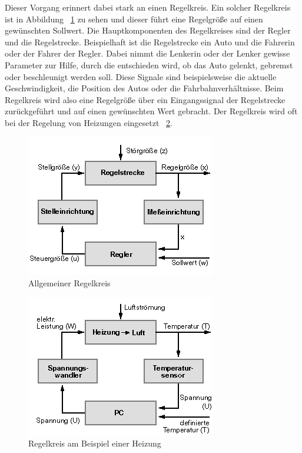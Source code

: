 Dieser Vorgang erinnert dabei stark an einen Regelkreis.
Ein solcher Regelkreis ist in Abbildung ~\ref{fig:regelkreis} zu sehen und dieser führt eine Regelgröße auf einen gewünschten Sollwert.
Die Hauptkomponenten des Regelkreises sind der Regler und die Regelstrecke.
Beispielhaft ist die Regelstrecke ein Auto und die Fahrerin oder der Fahrer der Regler.
Dabei nimmt die Lenkerin oder der Lenker gewisse Parameter zur Hilfe, durch die entschieden wird, ob das Auto gelenkt, gebremst oder beschleunigt werden soll.
Diese Signale sind beispielsweise die aktuelle Geschwindigkeit, die Position des Autos oder die Fahrbahnverhältnisse.
Beim Regelkreis wird also eine Regelgröße über ein Eingangssignal der Regelstrecke zurückgeführt und auf einen gewünschten Wert gebracht.
Der Regelkreis wird oft bei der Regelung von Heizungen eingesetzt ~\ref{fig:heizungRegelKreis}.\cite{regelkreis, regelkreisBeispiel}

\begin{figure}[hbt!]
    \centering
    \includegraphics[scale=0.85]{pics/regelkreis}
    \caption{Allgemeiner Regelkreis ~\cite{regelkreis}}
    \label{fig:regelkreis}
\end{figure}

\begin{figure}[hbt!]
    \centering
    \includegraphics[scale=0.85]{pics/regelkreis_heizung}
    \caption{Regelkreis am Beispiel einer Heizung ~\cite{regelkreis}}
    \label{fig:heizungRegelKreis}
\end{figure}

